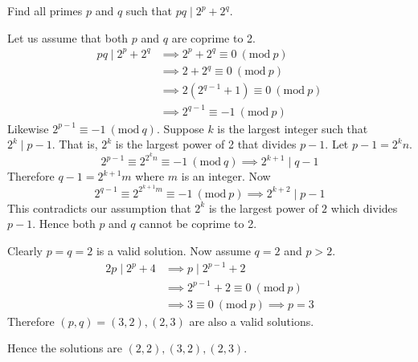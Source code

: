\documentclass[11pt,numbers=noenddot,svgnames,dvipsnames]{scrartcl}
\renewcommand{\pmod}[1]{\ (\mathrm{mod}\ #1)}
\begin{document}
\begin{example}
    Find all primes $p$ and $q$ such that $pq \mid 2^{p} + 2^{q}$.
\end{example}
\begin{sol}
    Let us assume that both $p$ and $q$ are coprime to 2.
    \begin{align*}
        pq \mid 2^p + 2^q &\implies 2^p + 2^q \equiv 0 \pmod p \\
                          &\implies 2 + 2^q \equiv 0 \pmod p \\
                          &\implies 2(2^{q-1} + 1) \equiv 0 \pmod p \\
                          &\implies 2^{q-1} \equiv -1 \pmod p 
    \end{align*}
    Likewise $2^{p-1} \equiv -1 \pmod q$. Suppose $k$ is the largest integer 
    such that $2^{k} \mid p-1$. That is, $2^{k}$ is the largest power of 2 that divides $p - 1$. 
    Let $p-1 = 2^{k}n$. 
    \[
        2^{p-1} \equiv 2^{2^{k}n} \equiv -1 \pmod q \implies 2^{k+1} \mid q - 1
    \]
    Therefore $q-1 = 2^{k+1}m$ where $m$ is an integer. Now 
    \[
        2^{q-1} \equiv 2^{2^{k+1}m} \equiv -1 \pmod p \implies 2^{k+2}\mid p - 1
    \]
    This contradicts our assumption that $2^{k}$ is the largest power of $2$ which 
    divides $p-1$. Hence both $p$ and $q$ cannot be coprime to 2. 

    Clearly $p=q=2$ is a valid solution. Now assume $q=2$ and $p>2$. 
    \begin{align*}
        2p \mid 2^{p} + 4 &\implies p \mid 2^{p-1} + 2 \\
                          &\implies 2^{p-1} + 2 \equiv 0 \pmod p \\
                          &\implies 3 \equiv 0 \pmod p \implies p = 3
    \end{align*}
    Therefore $(p,q) = (3, 2), (2, 3)$ are also a valid solutions. 

    Hence the solutions are $(2,2), (3,2), (2,3)$.
\end{sol}
\end{document}
